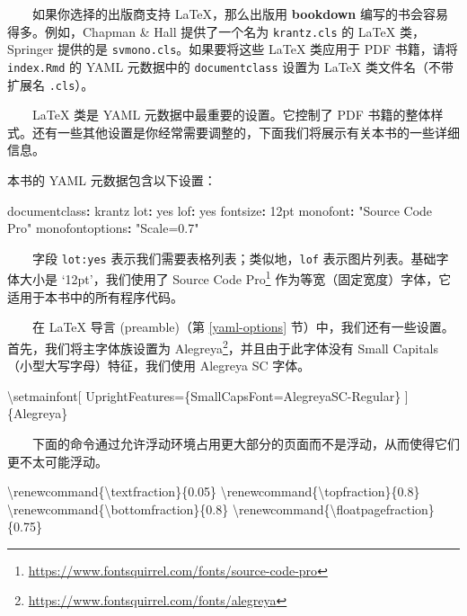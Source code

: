 \documentclass[
  12pt,
]{krantz}
\newenvironment{Shaded}{\begin{snugshade}}{\end{snugshade}}
\newcommand{\AttributeTok}[1]{\textcolor[rgb]{0.77,0.63,0.00}{#1}}
\newcommand{\CharTok}[1]{\textcolor[rgb]{0.31,0.60,0.02}{#1}}
\newcommand{\ExtensionTok}[1]{#1}
\newcommand{\FunctionTok}[1]{\textcolor[rgb]{0.00,0.00,0.00}{#1}}
\newcommand{\KeywordTok}[1]{\textcolor[rgb]{0.13,0.29,0.53}{\textbf{#1}}}
\newcommand{\NormalTok}[1]{#1}
\newcommand{\StringTok}[1]{\textcolor[rgb]{0.31,0.60,0.02}{#1}}
\renewcommand{\href}[2]{#2\footnote{\url{#1}}}
\theoremstyle{definition}
\theoremstyle{definition}
\theoremstyle{definition}
\theoremstyle{definition}
\theoremstyle{remark}
\begin{document}
  如果你选择的出版商支持 LaTeX，那么出版用 \textbf{bookdown} 编写的书会容易得多。例如，Chapman \& Hall 提供了一个名为 \texttt{krantz.cls} 的 LaTeX 类，Springer 提供的是 \texttt{svmono.cls}。如果要将这些 LaTeX 类应用于 PDF 书籍，请将 \texttt{index.Rmd} 的 YAML 元数据中的 \texttt{documentclass} 设置为 LaTeX 类文件名（不带扩展名 \texttt{.cls}）。

  LaTeX 类是 YAML 元数据中最重要的设置。它控制了 PDF 书籍的整体样式。还有一些其他设置是你经常需要调整的，下面我们将展示有关本书的一些详细信息。

本书的 YAML 元数据包含以下设置：

\begin{Shaded}
\begin{Highlighting}[]
\FunctionTok{documentclass}\KeywordTok{:}\AttributeTok{ krantz}
\FunctionTok{lot}\KeywordTok{:}\AttributeTok{ }\CharTok{yes}
\FunctionTok{lof}\KeywordTok{:}\AttributeTok{ }\CharTok{yes}
\FunctionTok{fontsize}\KeywordTok{:}\AttributeTok{ 12pt}
\FunctionTok{monofont}\KeywordTok{:}\AttributeTok{ }\StringTok{"Source Code Pro"}
\FunctionTok{monofontoptions}\KeywordTok{:}\AttributeTok{ }\StringTok{"Scale=0.7"}
\end{Highlighting}
\end{Shaded}

  字段 \texttt{lot:yes} 表示我们需要表格列表；类似地，\texttt{lof} 表示图片列表。基础字体大小是 `12pt'，我们使用了 \href{https://www.fontsquirrel.com/fonts/source-code-pro}{Source Code Pro} 作为等宽（固定宽度）字体，它适用于本书中的所有程序代码。

  在 LaTeX 导言 (preamble)（第 \ref{yaml-options} 节）中，我们还有一些设置。首先，我们将主字体族设置为 \href{https://www.fontsquirrel.com/fonts/alegreya}{Alegreya}，并且由于此字体没有 {Small Capitals}（小型大写字母）特征，我们使用 Alegreya SC 字体。

\begin{Shaded}
\begin{Highlighting}[]
\FunctionTok{\textbackslash{}setmainfont}\NormalTok{[}
\NormalTok{  UprightFeatures=\{SmallCapsFont=AlegreyaSC{-}Regular\}}
\NormalTok{]\{Alegreya\}}
\end{Highlighting}
\end{Shaded}

  下面的命令通过允许浮动环境占用更大部分的页面而不是浮动，从而使得它们更不太可能浮动。

\begin{Shaded}
\begin{Highlighting}[]
\FunctionTok{\textbackslash{}renewcommand}\NormalTok{\{}\ExtensionTok{\textbackslash{}textfraction}\NormalTok{\}\{0.05\}}
\FunctionTok{\textbackslash{}renewcommand}\NormalTok{\{}\ExtensionTok{\textbackslash{}topfraction}\NormalTok{\}\{0.8\}}
\FunctionTok{\textbackslash{}renewcommand}\NormalTok{\{}\ExtensionTok{\textbackslash{}bottomfraction}\NormalTok{\}\{0.8\}}
\FunctionTok{\textbackslash{}renewcommand}\NormalTok{\{}\ExtensionTok{\textbackslash{}floatpagefraction}\NormalTok{\}\{0.75\}}
\end{Highlighting}
\end{Shaded}
\end{document}
